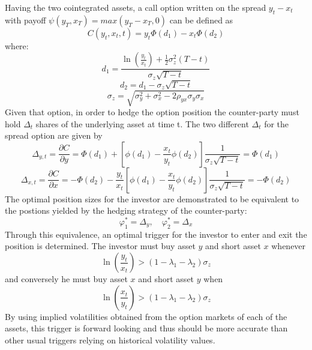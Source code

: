 Having the two cointegrated assets, a call option written on the spread $y_t - x_t$ with payoff $\psi(y_T, x_T)=max(y_T-x_T,0)$ can be defined as 
\begin{equation}
    C(y_t,x_t,t)=y_t \Phi(d_1)-x_t \Phi(d_2)
    \label{spread_option}
\end{equation}
where:
\begin{equation}
    \label{e:calc-d1}
    d_1=\frac{\ln\left(\frac{y_t}{x_t}\right)+\frac{1}{2}\sigma^2_z(T-t)}{\sigma_z \sqrt{T-t}}
\end{equation}
\begin{equation}
    d_2=d_1-\sigma_z \sqrt{T-t}
\end{equation}
\begin{equation}
    \sigma_z=\sqrt{\sigma_y^2+ \sigma_x^2-2\rho_{yx}\sigma_y\sigma_x}
\end{equation}
Given that option, in order to hedge the option position the counter-party must hold $\Delta_t$ shares of the underlying asset at time t. The two different $\Delta_t$ for the spread option are given by 
\begin{equation}
    \label{e:position-size-model-1}
    \Delta_{y,t} = \frac{\partial C}{\partial y} = \Phi(d_1)+\left[\phi(d_1)-\frac{x_t}{y_t}\phi(d_2)\right] \frac{1}{\sigma_z \sqrt{T-t}}=\Phi(d_1)
\end{equation}
\begin{equation}
    \label{e:position-size-model-2}
    \Delta_{x,t} = \frac{\partial C}{\partial x} = -\Phi(d_2)-\frac{y_t}{x_t}\left[\phi(d_1)-\frac{x_t}{y_t}\phi(d_2)\right] \frac{1}{\sigma_z \sqrt{T-t}}=-\Phi(d_2)
\end{equation}
The optimal position sizes for the investor are demonstrated to be equivalent to the postions yielded by the hedging strategy of the counter-party:
\begin{equation}
    \label{e:position-sizes}
    \varphi^*_1=\Delta_y,\quad \varphi^*_2=\Delta_x
\end{equation}
Through this equivalence, an optimal trigger for the investor to  enter and exit the position is determined. The investor must buy asset $y$ and short asset $x$ whenever 
\begin{equation}
    \label{e:trigger-1}
    \ln\left(\frac{y_t}{x_t}\right) > (1-\lambda_1 - \lambda_2)\sigma_z
\end{equation}
and conversely he must buy asset $x$ and short asset $y$ when
\begin{equation}
    \ln\left(\frac{x_t}{y_t}\right) > (1-\lambda_1 - \lambda_2)\sigma_z
\end{equation}
By using implied volatilities obtained from the option markets of each of the assets, this trigger is forward looking and thus should be more accurate than other usual triggers relying on historical volatility values. 

